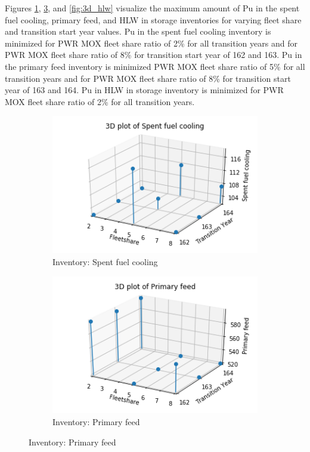 Figures \ref{fig:3d_sfc}, \ref{fig:3d_pf}, and \ref{fig:3d_hlw}
visualize the maximum amount of Pu in the spent fuel cooling, 
primary feed, and \gls{HLW} in storage inventories for varying 
fleet share and transition start year values. 
Pu in the spent fuel cooling inventory is minimized for PWR MOX
fleet share ratio of 2\% for all transition years
and for PWR MOX fleet share ratio of 8\% for 
transition start year of 162 and 163.  
Pu in the primary feed inventory is minimized PWR MOX
fleet share ratio of 5\% for all transition years and for PWR MOX 
fleet share ratio of 8\% for 
transition start year of 163 and 164.                       
Pu in HLW in storage inventory is minimized for PWR MOX
fleet share ratio of 2\% for all transition years. 

\begin{figure}[H]
    \centering
    \begin{subfigure}[t]{\textwidth}
    \centering
        \includegraphics[width=0.4\linewidth]{figures/3d_sfc} 
        \caption{Inventory: Spent fuel cooling}
        \label{fig:3d_sfc}
    \end{subfigure}
    \begin{subfigure}[t]{0.4\textwidth}
        \centering
        \includegraphics[width=\linewidth]{figures/3d_pf} 
        \caption{Inventory: Primary feed}
	    \label{fig:3d_pf}

\end{subfigure}
\end{figure}
